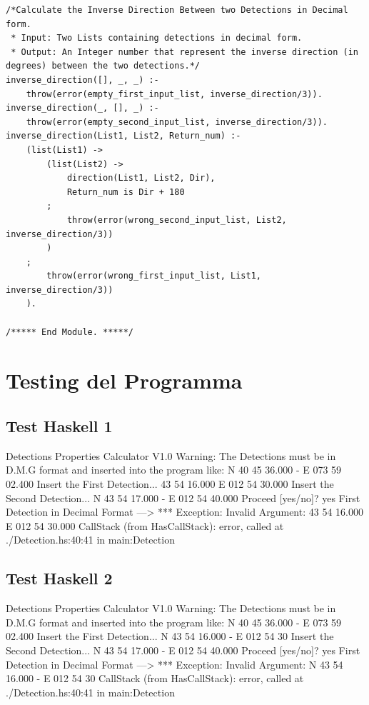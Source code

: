 \documentclass{article}
\begin{document}
\begin{lstlisting}
/*Calculate the Inverse Direction Between two Detections in Decimal form.
 * Input: Two Lists containing detections in decimal form.
 * Output: An Integer number that represent the inverse direction (in degrees) between the two detections.*/
inverse_direction([], _, _) :-
    throw(error(empty_first_input_list, inverse_direction/3)).
inverse_direction(_, [], _) :-
    throw(error(empty_second_input_list, inverse_direction/3)).
inverse_direction(List1, List2, Return_num) :-
    (list(List1) -> 
        (list(List2) -> 
            direction(List1, List2, Dir),
            Return_num is Dir + 180
        ;
            throw(error(wrong_second_input_list, List2, inverse_direction/3))
        )
    ;
        throw(error(wrong_first_input_list, List1, inverse_direction/3))
    ).
    
/***** End Module. *****/
\end{lstlisting}
\newpage

\section{Testing del Programma}
\subsection*{Test Haskell 1}
	\begin{spverbatim}
		Detections Properties Calculator V1.0 
		Warning: The Detections must be in D.M.G format and inserted into the program like: N 40 45 36.000 - E 073 59 02.400
		Insert the First Detection...
		43 54 16.000  E 012 54 30.000
		Insert the Second Detection...
		N 43 54 17.000 - E 012 54 40.000
		Proceed [yes/no]?
		yes
		First Detection in Decimal Format ---> *** Exception: Invalid Argument: 43 54 16.000  E 012 54 30.000
		CallStack (from HasCallStack):
		error, called at ./Detection.hs:40:41 in main:Detection
	\end{spverbatim}

\subsection*{Test Haskell 2}
	\begin{spverbatim}
		Detections Properties Calculator V1.0 
		Warning: The Detections must be in D.M.G format and inserted into the program like: N 40 45 36.000 - E 073 59 02.400
		Insert the First Detection...
		N 43 54 16.000 - E 012 54 30
		Insert the Second Detection...
		N 43 54 17.000 - E 012 54 40.000
		Proceed [yes/no]?
		yes
		First Detection in Decimal Format ---> *** Exception: Invalid Argument: N 43 54 16.000 - E 012 54 30
		CallStack (from HasCallStack):
		error, called at ./Detection.hs:40:41 in main:Detection
	\end{spverbatim}
\end{document}
